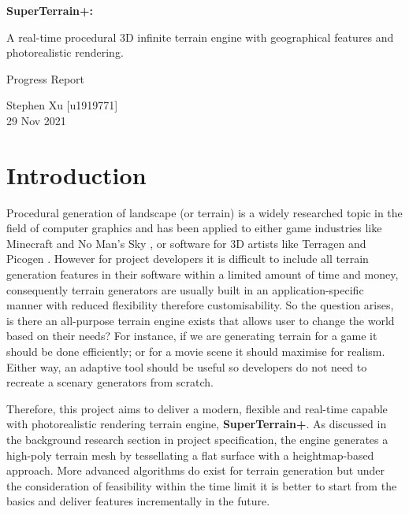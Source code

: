 \documentclass[oneside, a4paper]{article}
\begin{document}
    \begin{titlepage}
        \begin{center}
            \huge
            \vspace*{4cm}
            \textbf{SuperTerrain+:}

            \vspace*{1cm}
            A real-time procedural 3D infinite terrain engine with geographical features and photorealistic rendering.

            \LARGE
            \vspace*{2cm}
            Progress Report

            \vspace*{1cm}
            Stephen Xu [u1919771] \\
            29 Nov 2021
        \end{center}
    \end{titlepage}
    \newpage
    \large
    \flushleft

    \section{Introduction}
    Procedural generation of landscape (or terrain) is a widely researched topic in the field of computer graphics and has been applied to either game industries like Minecraft \cite{mc} and No Man's Sky \cite{no_mans_sky}, or software for 3D artists like Terragen \cite{terragen} and Picogen \cite{picogen}. However for project developers it is difficult to include all terrain generation features in their software within a limited amount of time and money, consequently terrain generators are usually built in an application-specific manner with reduced flexibility therefore customisability. So the question arises, is there an all-purpose terrain engine exists that allows user to change the world based on their needs? For instance, if we are generating terrain for a game it should be done efficiently; or for a movie scene it should maximise for realism. Either way, an adaptive tool should be useful so developers do not need to recreate a scenary generators from scratch.

    Therefore, this project aims to deliver a modern, flexible and real-time capable with photorealistic rendering terrain engine, \textbf{SuperTerrain+}. As discussed in the background research section in project specification, the engine generates a high-poly terrain mesh by tessellating a flat surface with a heightmap-based approach. More advanced algorithms do exist for terrain generation but under the consideration of feasibility within the time limit it is better to start from the basics and deliver features incrementally in the future.
\end{document}
